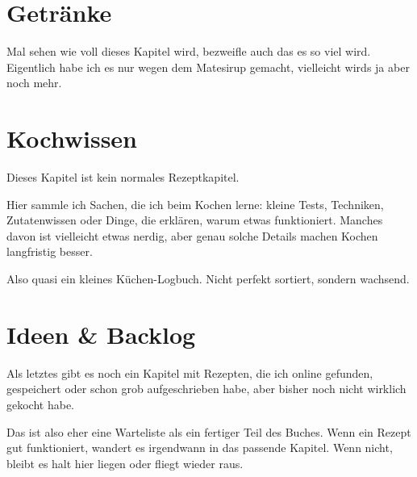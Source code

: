 \documentclass[
  a4paper,
  twoside,
  11pt
]{article}
\begin{document}
\section{Getränke}

Mal sehen wie voll dieses Kapitel wird, bezweifle auch das es so viel wird. Eigentlich habe ich es nur wegen dem Matesirup gemacht, vielleicht wirds ja aber noch mehr.

\mylocaltableofcontents%
\newpage







\section{Kochwissen}

Dieses Kapitel ist kein normales Rezeptkapitel.

Hier sammle ich Sachen, die ich beim Kochen lerne: kleine Tests, Techniken, Zutatenwissen oder Dinge, die erklären, warum etwas funktioniert. Manches davon ist vielleicht etwas nerdig, aber genau solche Details machen Kochen langfristig besser.

Also quasi ein kleines Küchen-Logbuch. Nicht perfekt sortiert, sondern wachsend.

\mylocaltableofcontents%
\newpage



\section{Ideen \& Backlog}

Als letztes gibt es noch ein Kapitel mit Rezepten, die ich online gefunden, gespeichert oder schon grob aufgeschrieben habe, aber bisher noch nicht wirklich gekocht habe.

Das ist also eher eine Warteliste als ein fertiger Teil des Buches. Wenn ein Rezept gut funktioniert, wandert es irgendwann in das passende Kapitel. Wenn nicht, bleibt es halt hier liegen oder fliegt wieder raus.

\mylocaltableofcontents%
\newpage
\end{document}
